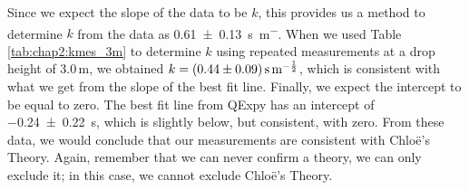 Since we expect the slope of the data to be $k$, this provides us a method to determine $k$ from the data as \SI{0.61\pm 0.13}{s.m^{-}}. When we used Table \ref{tab:chap2:kmes_3m} to determine $k$ using repeated measurements at a drop height of 3.0\,m, we obtained $k=\SI{0.44\pm 0.09}{s.m^{-\frac{1}{2}}}$, which is consistent with what we get from the slope of the best fit line. Finally, we expect the intercept to be equal to zero. The best fit line from QExpy has an intercept of \SI{-0.24\pm 0.22}{s}, which is slightly below, but consistent, with zero. From these data, we would conclude that our measurements are consistent with Chlo\"e's Theory. Again, remember that we can never confirm a theory, we can only exclude it; in this case, we cannot exclude Chlo\"e's Theory.